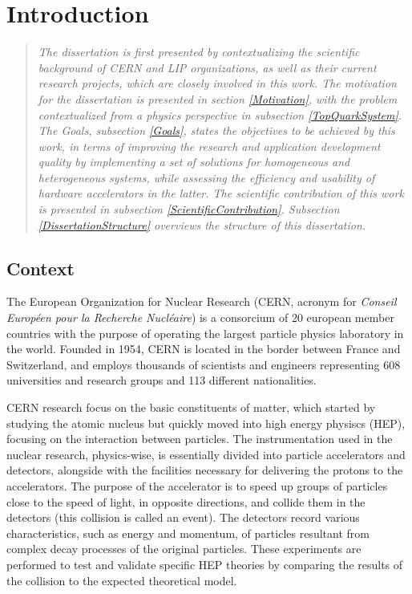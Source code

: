 \chapter{Introduction}
\label{Introduction}

\begin{quote}
\textit{The dissertation is first presented by contextualizing the scientific background of CERN and LIP organizations, as well as their current research projects, which are closely involved in this work. The motivation for the dissertation is presented in section \ref{Motivation}, with the problem contextualized from a physics perspective in subsection \ref{TopQuarkSystem}. The Goals, subsection \ref{Goals}, states the objectives to be achieved by this work, in terms of improving the research and application development quality by implementing a set of solutions for homogeneous and heterogeneous systems, while assessing the efficiency and usability of hardware accelerators in the latter. The scientific contribution of this work is presented in subsection \ref{ScientificContribution}. Subsection \ref{DissertationStructure} overviews the structure of this dissertation.}
\end{quote}

\section{Context}
\label{Context}

The European Organization for Nuclear Research \cite{CERN} (CERN, acronym for \textit{Conseil Européen pour la Recherche Nucléaire}) is a consorcium of 20 european member countries with the purpose of operating the largest particle physics laboratory in the world. Founded in 1954, CERN is located in the border between France and Switzerland, and employs thousands of scientists and engineers representing 608 universities and research groups and 113 different nationalities.

CERN research focus on the basic constituents of matter, which started by studying the atomic nucleus but quickly moved into high energy physiscs (HEP), focusing on the interaction between particles. The instrumentation used in the nuclear research, physics-wise, is essentially divided into particle accelerators and detectors, alongside with the facilities necessary for delivering the protons to the accelerators. The purpose of the accelerator is to speed up groups of particles close to the speed of light, in opposite directions, and collide them in the detectors (this collision is called an event). The detectors record various characteristics, such as energy and momentum, of particles resultant from complex decay processes of the original particles. These experiments are performed to test and validate specific HEP theories by comparing the results of the collision to the expected theoretical model.

